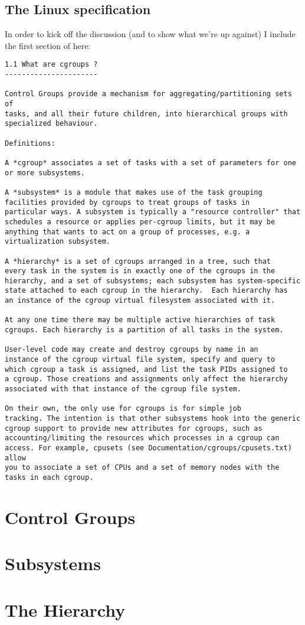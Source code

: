 \documentclass[a4paper,twoside,12pt]{article}
\begin{document}
\subsection{The Linux specification \cite{linuxspecs}}

In order to kick off the discussion (and to show what we're up against) I include the first section of \cite{linuxspecs} here:

\begin{verbatim}
1.1 What are cgroups ?
----------------------

Control Groups provide a mechanism for aggregating/partitioning sets of
tasks, and all their future children, into hierarchical groups with
specialized behaviour.

Definitions:

A *cgroup* associates a set of tasks with a set of parameters for one
or more subsystems.

A *subsystem* is a module that makes use of the task grouping
facilities provided by cgroups to treat groups of tasks in
particular ways. A subsystem is typically a "resource controller" that
schedules a resource or applies per-cgroup limits, but it may be
anything that wants to act on a group of processes, e.g. a
virtualization subsystem.

A *hierarchy* is a set of cgroups arranged in a tree, such that
every task in the system is in exactly one of the cgroups in the
hierarchy, and a set of subsystems; each subsystem has system-specific
state attached to each cgroup in the hierarchy.  Each hierarchy has
an instance of the cgroup virtual filesystem associated with it.

At any one time there may be multiple active hierarchies of task
cgroups. Each hierarchy is a partition of all tasks in the system.

User-level code may create and destroy cgroups by name in an
instance of the cgroup virtual file system, specify and query to
which cgroup a task is assigned, and list the task PIDs assigned to
a cgroup. Those creations and assignments only affect the hierarchy
associated with that instance of the cgroup file system.

On their own, the only use for cgroups is for simple job
tracking. The intention is that other subsystems hook into the generic
cgroup support to provide new attributes for cgroups, such as
accounting/limiting the resources which processes in a cgroup can
access. For example, cpusets (see Documentation/cgroups/cpusets.txt) allow
you to associate a set of CPUs and a set of memory nodes with the
tasks in each cgroup.
\end{verbatim}


\section{Control Groups}

\section{Subsystems}

\section{The Hierarchy}
\end{document}
